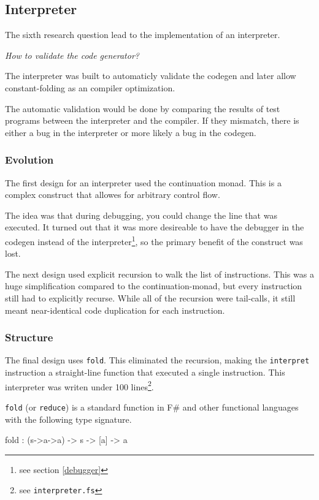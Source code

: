 \subsection{Interpreter}
The sixth research question lead to the implementation of an interpreter.

\textit{How to validate the code generator?}

The interpreter was built to automaticly validate the codegen and later allow constant-folding as an compiler optimization.

The automatic validation would be done by comparing the results of test programs between the interpreter and the compiler.
If they mismatch, there is either a bug in the interpreter or more likely a bug in the codegen.

\subsubsection{Evolution}
The first design for an interpreter used the continuation monad.
This is a complex construct that allowes for arbitrary control flow.

The idea was that during debugging, you could change the line that was executed.
It turned out that it was more desireable to have the debugger in the codegen instead of the interpreter\footnote{see section \ref{debugger}}, so the primary benefit of the construct was lost.

The next design used explicit recursion to walk the list of instructions.
This was a huge simplification compared to the continuation-monad, but every instruction still had to explicitly recurse.
While all of the recursion were tail-calls, it still meant near-identical code duplication for each instruction.

\subsubsection{Structure}
The final design uses \verb|fold|.
This eliminated the recursion, making the \verb|interpret| instruction a straight-line function that executed a single instruction.
This interpreter was writen under 100 lines\footnote{see \texttt{interpreter.fs}}.

\verb|fold| (or \verb|reduce|) is a standard function in F\# and other functional languages with the following type signature.

\begin{code}
    fold : (s->a->a) -> s -> [a] -> a
\end{code}

